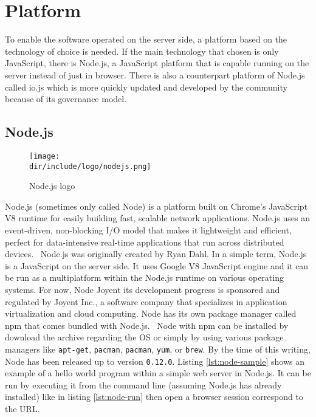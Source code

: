\section{Platform}
\label{sec:platform}

To enable the software operated on the server side, a platform based on the technology of choice is needed.
If the main technology that chosen is only JavaScript, there is Node.js, a JavaScript platform that is capable running on the server instead of just in browser.
There is also a counterpart platform of Node.js called io.js which is more quickly updated and developed by the community because of its governance model.

\clearpage

\subsection{Node.js}

\begin{wrapfigure}{r}{0.5\textwidth}
  \vspace{-20pt}
  \begin{center}
    \texttt{[image: \\dir/include/logo/nodejs.png]}
  \end{center}
  \vspace{-20pt}
  \caption{Node.js logo}
  \label{fig:nodejs-logo}
  \vspace{-10pt}
\end{wrapfigure}

Node.js\textsuperscript{\textregistered} (sometimes only called Node) is
a platform built on Chrome's JavaScript V8 runtime for easily building fast, scalable network applications.
Node.js uses an event-driven, non-blocking I/O model that makes it lightweight and efficient, perfect for data-intensive real-time applications that run across distributed devices.~\autocite{Joyent:2015:Node}
Node.js was originally created by Ryan Dahl.
In a simple term, Node.js is a JavaScript on the server side.
It uses Google V8 JavaScript engine and it can be run as a multiplatform within the Node.js runtime on various operating systems.
For now, Node Joyent its development progress is sponsored and regulated by Joyent Inc., a software company that specializes in application virtualization and cloud computing.
Node has its own package manager called \ac{npm} that comes bundled with Node.js.~\autocite{Vincent:2014:npm}
Node with npm can be installed by download the archive regarding the \ac{OS} or simply by using various package managers like \verb|apt-get|, \verb|pacman|, \verb|pacman|, \verb|yum|, or \verb|brew|.
By the time of this writing, Node has been released up to version \verb|0.12.0|.
Listing \autoref{lst:node-sample} shows an example of a hello world program within a simple web server in Node.js.
It can be run by executing it from the command line (assuming Node.js has already installed) like in listing \autoref{lst:node-run} then open a browser session correspond to the \ac{URL}.

